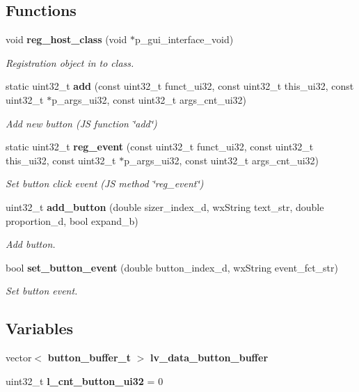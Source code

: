 \subsection*{Functions}
\begin{DoxyCompactItemize}
\item 
void \textbf{ reg\+\_\+host\+\_\+class} (void $\ast$p\+\_\+gui\+\_\+interface\+\_\+void)
\begin{DoxyCompactList}\small\item\em Registration object in to class. \end{DoxyCompactList}\item 
static uint32\+\_\+t \textbf{ add} (const uint32\+\_\+t funct\+\_\+ui32, const uint32\+\_\+t this\+\_\+ui32, const uint32\+\_\+t $\ast$p\+\_\+args\+\_\+ui32, const uint32\+\_\+t args\+\_\+cnt\+\_\+ui32)
\begin{DoxyCompactList}\small\item\em Add new button (JS function \char`\"{}add\char`\"{}) \end{DoxyCompactList}\item 
static uint32\+\_\+t \textbf{ reg\+\_\+event} (const uint32\+\_\+t funct\+\_\+ui32, const uint32\+\_\+t this\+\_\+ui32, const uint32\+\_\+t $\ast$p\+\_\+args\+\_\+ui32, const uint32\+\_\+t args\+\_\+cnt\+\_\+ui32)
\begin{DoxyCompactList}\small\item\em Set button click event (JS method \char`\"{}reg\+\_\+event\char`\"{}) \end{DoxyCompactList}\item 
uint32\+\_\+t \textbf{ add\+\_\+button} (double sizer\+\_\+index\+\_\+d, wx\+String text\+\_\+str, double proportion\+\_\+d, bool expand\+\_\+b)
\begin{DoxyCompactList}\small\item\em Add button. \end{DoxyCompactList}\item 
bool \textbf{ set\+\_\+button\+\_\+event} (double button\+\_\+index\+\_\+d, wx\+String event\+\_\+fct\+\_\+str)
\begin{DoxyCompactList}\small\item\em Set button event. \end{DoxyCompactList}\end{DoxyCompactItemize}
\subsection*{Variables}
\begin{DoxyCompactItemize}
\item 
vector$<$ \textbf{ button\+\_\+buffer\+\_\+t} $>$ \textbf{ lv\+\_\+data\+\_\+button\+\_\+buffer}
\item 
\mbox{\label{group___button_ga43a3c4dd74be17115ca7f07710241238}} 
uint32\+\_\+t {\bfseries l\+\_\+cnt\+\_\+button\+\_\+ui32} = 0
\end{DoxyCompactItemize}


